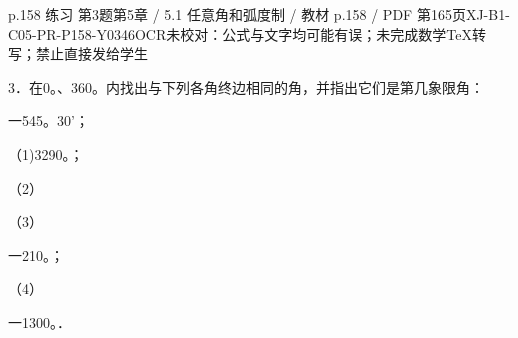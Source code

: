 \begin{bankitem}{p.158 练习 第3题}{第5章 / 5.1 任意角和弧度制 / 教材 p.158 / PDF 第165页}{XJ-B1-C05-PR-P158-Y0346}{OCR未校对：公式与文字均可能有误；未完成数学TeX转写；禁止直接发给学生}
\begin{ocrdraft}
\par
3．在0。、360。内找出与下列各角终边相同的角，并指出它们是第几象限角：
\par
一545。30'；
\par
（1)3290。；
\par
（2）
\par
（3）
\par
一210。；
\par
（4）
\par
一1300。．
\end{ocrdraft}
\end{bankitem}
